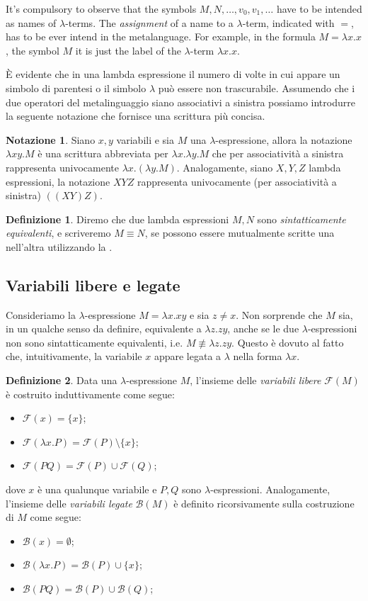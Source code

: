 \documentclass[a4paper,11pt]{article}
\theoremstyle{definition}
\newtheorem{defn}{Definizione}
\newtheorem{notazione}{Notazione}
\newcommand{\FF}{\mathcal{F}}
\newcommand{\BB}{\mathcal{B}}
\begin{document}
It's compulsory to observe that the symbols $M,N,\dots, v_0, v_1,\dots$ have
to be intended as names of $\lambda$-terms. The \textit{assignment} of a name
to a $\lambda$-term, indicated with $=$, has to be ever intend in the
metalanguage. For example, in the formula $M=\lambda x.x$, the symbol $M$ it
is just the label of the $\lambda$-term $\lambda x.x$.

È evidente che in una lambda espressione il numero di volte in cui appare un
simbolo di parentesi o il simbolo $\lambda$ può essere non trascurabile.
Assumendo che i due operatori del metalinguaggio siano associativi a sinistra
possiamo introdurre la seguente notazione che fornisce una scrittura più concisa.
\begin{notazione}
  \label{not:sinistra}
  Siano $x,y$ variabili e sia $M$ una $\lambda$-espressione, allora la notazione
  $\lambda xy.M$ è una scrittura abbreviata per $\lambda x.\lambda y.M$ che
  per associatività a sinistra rappresenta univocamente $\lambda x.(\lambda y.M)$.
  Analogamente, siano $X,Y,Z$ lambda espressioni, la notazione $XYZ$
  rappresenta univocamente (per associatività a sinistra) $((XY)Z)$.
\end{notazione}

\begin{defn}
  Diremo che due lambda espressioni $M,N$ sono \textit{sintatticamente
  equivalenti}, e
  scriveremo $M\equiv N$, se possono essere mutualmente scritte una
  nell'altra utilizzando la .
\end{defn}
\subsection{Variabili libere e legate}
Consideriamo la $\lambda$-espressione $M=\lambda x.xy$ e sia $z\ne x$. Non sorprende che $M$
sia, in un qualche senso da definire, equivalente a $\lambda z.zy$, anche se le due
$\lambda$-espressioni non sono sintatticamente equivalenti, i.e. $M\not\equiv
\lambda z.zy$. Questo è dovuto al fatto che, intuitivamente, la variabile $x$
appare legata a $\lambda$ nella forma $\lambda x$.
\begin{defn}
  Data una $\lambda$-espressione $M$, l'insieme delle \textit{variabili
  libere} $\FF(M)$ è costruito induttivamente come segue:
  \begin{itemize}
    \item $\FF(x)=\{x\}$;
    \item $\FF(\lambda x.P)=\FF(P)\setminus\{x\}$;
    \item $\FF(PQ)=\FF(P)\cup\FF(Q)$;
  \end{itemize}
  dove $x$ è una qualunque variabile e $P,Q$ sono $\lambda$-espressioni.
  Analogamente, l'insieme delle \textit{variabili legate} $\BB(M)$ è definito
  ricorsivamente sulla costruzione di $M$ come segue:
  \begin{itemize}
    \item $\BB(x)=\emptyset$;
    \item $\BB(\lambda x.P) = \BB(P)\cup \{x\}$;
    \item $\BB(PQ)=\BB(P)\cup\BB(Q)$;
  \end{itemize}
\end{defn}
\end{document}
